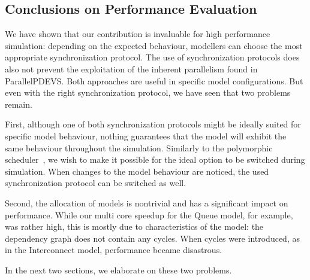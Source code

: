 \subsection{Conclusions on Performance Evaluation}
We have shown that our contribution is invaluable for high performance simulation: depending on the expected behaviour, modellers can choose the most appropriate synchronization protocol.
The use of synchronization protocols does also not prevent the exploitation of the inherent parallelism found in \textsf{ParallelPDEVS}.
Both approaches are useful in specific model configurations.
But even with the right synchronization protocol, we have seen that two problems remain.

First, although one of both synchronization protocols might be ideally suited for specific model behaviour, nothing guarantees that the model will exhibit the same behaviour throughout the simulation.
Similarly to the polymorphic scheduler~\cite{MasterThesis}, we wish to make it possible for the ideal option to be switched during simulation.
When changes to the model behaviour are noticed, the used synchronization protocol can be switched as well. 

Second, the allocation of models is nontrivial and has a significant impact on performance.
While our multi core speedup for the Queue model, for example, was rather high, this is mostly due to characteristics of the model: the dependency graph does not contain any cycles.
When cycles were introduced, as in the Interconnect model, performance became disastrous.

In the next two sections, we elaborate on these two problems.
